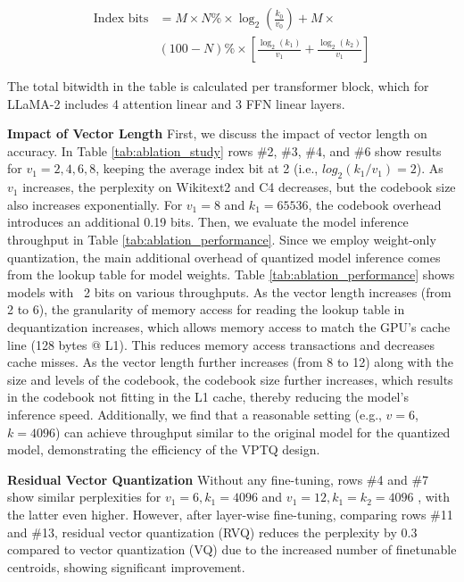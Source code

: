 \begin{equation}
\begin{aligned}
    \text{Index bits} & =  M \times N\% \times \log_2\left(\frac{k_0}{v_0}\right)  + M \times \\ & (100-N)\% \times \left[ \frac{\log_2(k_1)}{v_1} + \frac{\log_2(k_2)}{v_1} \right]
    \nonumber
\end{aligned}
\end{equation}








The total bitwidth in the table is calculated per transformer block, which for LLaMA-2 includes 4 attention linear and 3 FFN linear layers.


\textbf{Impact of Vector Length} First, we discuss the impact of vector length on accuracy. In Table \ref{tab:ablation_study} rows \#2, \#3, \#4, and \#6 show results for $v_1=2, 4, 6, 8$, keeping the average index bit at 2 (i.e., $log_2(k_1/v_1) = 2$). As $v_1$ increases, the perplexity on Wikitext2 and C4 decreases, but the codebook size also increases exponentially. For $v_1=8$ and $k_1=65536$, the codebook overhead introduces an additional 0.19 bits. 
Then, we evaluate the model inference throughput in Table \ref{tab:ablation_performance}. Since we employ weight-only quantization, the main additional overhead of quantized model inference comes from the lookup table for model weights. Table \ref{tab:ablation_performance} shows models with ~2 bits on various throughputs. As the vector length increases (from 2 to 6), the granularity of memory access for reading the lookup table in dequantization increases, which allows memory access to match the GPU's cache line (128 bytes @ L1). This reduces memory access transactions and decreases cache misses. As the vector length further increases (from 8 to 12) along with the size and levels of the codebook, the codebook size further increases, which results in the codebook not fitting in the L1 cache, thereby reducing the model's inference speed. Additionally, we find that a reasonable setting (e.g., \(v=6\), \(k=4096\)) can achieve throughput similar to the original model for the quantized model, demonstrating the efficiency of the VPTQ design.

\textbf{Residual Vector Quantization} Without any fine-tuning, rows \#4 and \#7 show similar perplexities for $v_1=6, k_1=4096$ and $v_1=12, k_1=k_2=4096$ , with the latter even higher. However, after layer-wise fine-tuning, comparing rows \#11 and \#13, residual vector quantization (RVQ) reduces the perplexity by 0.3 compared to vector quantization (VQ) due to the increased number of finetunable centroids, showing significant improvement.

